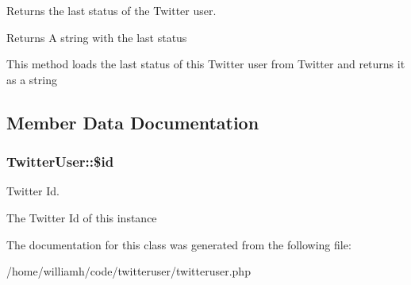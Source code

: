 Returns the last status of the Twitter user. 

\begin{DoxyReturn}{Returns}
A string with the last status
\end{DoxyReturn}
This method loads the last status of this Twitter user from Twitter and returns it as a string 

\subsection{Member Data Documentation}
\hypertarget{class_twitter_user_a4096acd6dd8fdc48d8d3523807fb3bef}{
\subsubsection[{\$id}]{\setlength{\rightskip}{0pt plus 5cm}TwitterUser::\$id}}
\label{class_twitter_user_a4096acd6dd8fdc48d8d3523807fb3bef}


Twitter Id. 

The Twitter Id of this instance 

The documentation for this class was generated from the following file:\begin{DoxyCompactItemize}
\item 
/home/williamh/code/twitteruser/twitteruser.php\end{DoxyCompactItemize}
